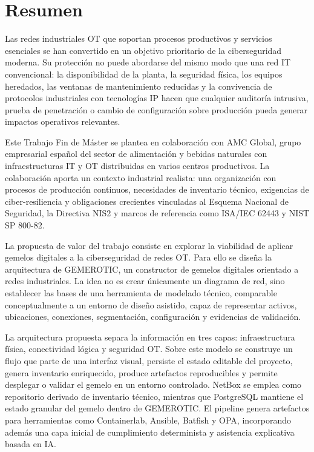 \chapter*{Resumen}

Las redes industriales OT que soportan procesos productivos y servicios esenciales se han convertido en un objetivo prioritario de la ciberseguridad moderna. Su protección no puede abordarse del mismo modo que una red IT convencional: la disponibilidad de la planta, la seguridad física, los equipos heredados, las ventanas de mantenimiento reducidas y la convivencia de protocolos industriales con tecnologías IP hacen que cualquier auditoría intrusiva, prueba de penetración o cambio de configuración sobre producción pueda generar impactos operativos relevantes.

Este Trabajo Fin de Máster se plantea en colaboración con AMC Global, grupo empresarial español del sector de alimentación y bebidas naturales con infraestructuras IT y OT distribuidas en varios centros productivos. La colaboración aporta un contexto industrial realista: una organización con procesos de producción continuos, necesidades de inventario técnico, exigencias de ciber-resiliencia y obligaciones crecientes vinculadas al Esquema Nacional de Seguridad, la Directiva NIS2 y marcos de referencia como ISA/IEC 62443 y NIST SP 800-82.

La propuesta de valor del trabajo consiste en explorar la viabilidad de aplicar gemelos digitales a la ciberseguridad de redes OT. Para ello se diseña la arquitectura de GEMEROTIC, un constructor de gemelos digitales orientado a redes industriales. La idea no es crear únicamente un diagrama de red, sino establecer las bases de una herramienta de modelado técnico, comparable conceptualmente a un entorno de diseño asistido, capaz de representar activos, ubicaciones, conexiones, segmentación, configuración y evidencias de validación.

La arquitectura propuesta separa la información en tres capas: infraestructura física, conectividad lógica y seguridad OT. Sobre este modelo se construye un flujo que parte de una interfaz visual, persiste el estado editable del proyecto, genera inventario enriquecido, produce artefactos reproducibles y permite desplegar o validar el gemelo en un entorno controlado. NetBox se emplea como repositorio derivado de inventario técnico, mientras que PostgreSQL mantiene el estado granular del gemelo dentro de GEMEROTIC. El pipeline genera artefactos para herramientas como Containerlab, Ansible, Batfish y OPA, incorporando además una capa inicial de cumplimiento determinista y asistencia explicativa basada en IA.

